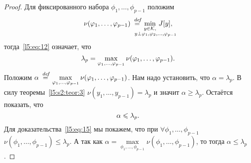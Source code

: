 \documentclass[12pt,a4paper,openany,fleqn]{book}
\newcommand {\defeq}{\stackrel{\hspace{0.09 cm}de\!f}{=}}
\newcommand {\eqdef}{\defeq}
\newcommand{\mc}[1]{\ensuremath{\mathcal{#1}}}
\newcommand{\K}{\mc{K}}
\theoremstyle{definition}
\begin{document}
\begin{proof}
	Для фиксированного набора $\phi_1,\ldots,\phi_{p-1}$ положим
	\begin{equation}
		\label{l5:eq:13}
		\hfill\nu(\phi_1,\ldots,\phi_{p-1})\eqdef\min\limits_{\substack{y\in\K,\\\lefteqn{\scriptstyle \hspace*{-0.8cm}y\perp\phi_1,\phi_2,\ldots,\phi_{p-1}}}}\,J[y],\hfill
	\end{equation}
тогда~\eqref{l5:eq:12} означает, что
\begin{equation}
	\label{l5:eq:14}
	\hfill\lambda_p=\max\limits_{\phi_1,\ldots,\phi_{p-1}}\nu(\phi_1,\ldots,\phi_{p-1}).\hfill
\end{equation}
Положим $\displaystyle\alpha\eqdef\max\limits_{\phi_1,\ldots,\phi_{p-1}}\nu(\phi_1,\ldots,\phi_{p-1})$. Нам надо установить, что $\alpha=\lambda_p$. В силу теоремы~\ref{l5:s2:teor:3} $\nu(y_1,\ldots,y_{p-1})=\lambda_p$ и значит $\alpha\geqslant\lambda_p$. Остаётся показать, что
\begin{equation}
	\label{l5:eq:15}
	\hfill\alpha\leqslant\lambda_p.\hfill
\end{equation} 
Для доказательства~\eqref{l5:eq:15} мы покажем, что при $\forall\phi_1,\ldots,\phi_{p-1}$  $\nu(\phi_1,\ldots,\phi_{p-1})\leqslant\lambda_p$. А так как $\alpha=\max\limits_{\phi_1,\ldots,\phi_{p-1}}\nu(\phi_1,\ldots,\phi_{p-1})$, то тогда $\alpha\leqslant\lambda_p$.


\end{proof}
\end{document}
